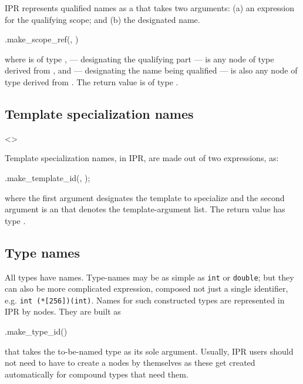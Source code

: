 \documentclass[11pt]{article}
\begin{document}
IPR represents qualified names as a  that takes two
arguments: (a) an expression for the qualifying scope;
and (b) the designated name.
\begin{Program}
  .make_scope_ref(, )
\end{Program}
where  is of type ,  --- designating
the qualifying part --- is any node of type derived from , and
 --- designating the name being qualified --- is also any node of
type derived from .  The return value is of type 
.

\subsection{Template specialization names}
\label{sec:name.specialization}
\begin{Grammar}
      <>
\end{Grammar}

Template specialization names,  in IPR, are made out
of two expressions, as:
\begin{Program}
  .make_template_id(, );
\end{Program}
where the first argument designates the template to specialize and the second
argument is an  that denotes the template-argument
list.  The return value has type . 

\subsection{Type names}
\label{sec:name.type-id}

All types have names.  Type-names may be as simple as \texttt{int} or
\texttt{double}; but they can also be more complicated expression, composed
not just a single identifier, e.g. \texttt{int (*[256])(int)}.  Names for such
constructed types are represented in IPR by  nodes.  They
are built as
\begin{Program}
  .make_type_id()
\end{Program}
that takes the to-be-named type as its sole argument.  Usually, IPR users
should not need to have to create a  nodes by themselves
as these get created automatically for compound types that need them.
\end{document}
